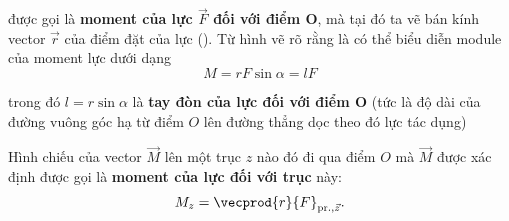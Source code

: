 \noindent
được gọi là \textbf{moment của lực $\vec{F}$ đối với điểm O}, mà tại đó ta vẽ bán kính vector $\vec{r}$ của điểm đặt của lực (). Từ hình vẽ rõ rằng là có thể biểu diễn module của moment lực dưới dạng 
\begin{equation}\label{eq:3_113}
M = rF\sin\alpha = lF
\end{equation}

\noindent
trong đó $l=r\sin\alpha$ là \textbf{tay đòn của lực đối với điểm O} (tức là độ dài của đường vuông góc hạ từ điểm $O$ lên đường thẳng dọc theo đó lực tác dụng) 

Hình chiếu của vector $\vec{M}$ lên một trục $z$ nào đó đi qua điểm $O$ mà $\vec{M}$ được xác định được gọi là \textbf{moment của lực đối với trục} này: 
\begin{equation}\label{eq:3_114}
M_z = \vecprod{r}{F}_{\text{pr.},\vec{z}}.
\end{equation}

